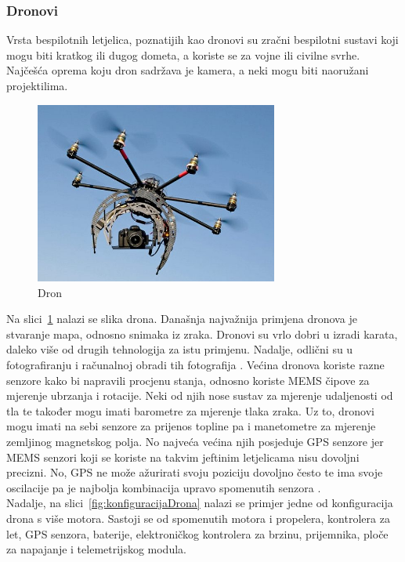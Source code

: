 \documentclass[times, utf8, diplomski]{fer}
\begin{document}
\subsubsection{Dronovi}
Vrsta bespilotnih letjelica, poznatijih kao dronovi su zračni bespilotni sustavi koji mogu biti kratkog ili dugog dometa, a koriste se za vojne ili civilne svrhe. Najčešća oprema koju dron sadržava je kamera, a neki mogu biti naoružani projektilima. 
\begin{figure}[htb]
\centering
\includegraphics[width=8cm]{img/drone.png}
\caption{Dron\protect\footnotemark}
\label{fig:dron}
\end{figure}
Na  slici~\ref{fig:dron}  nalazi  se  slika 
drona. Današnja najvažnija primjena dronova je stvaranje mapa, odnosno snimaka iz zraka. Dronovi su  vrlo dobri u izradi karata, daleko više od drugih tehnologija za istu primjenu. Nadalje, odlični su u fotografiranju i računalnoj  obradi  tih  fotografija \citep[str.~10]{Drones}. Većina dronova koriste razne senzore kako  bi  napravili  procjenu  stanja,  odnosno  koriste  MEMS  čipove  za  mjerenje  ubrzanja  i rotacije. Neki od njih nose sustav za mjerenje udaljenosti od tla te također mogu imati barometre za  mjerenje  tlaka  zraka.  Uz  to,  dronovi  mogu  imati  na  sebi senzore  za  prijenos  topline  pa  i manetometre za mjerenje zemljinog magnetskog polja. No najveća većina njih posjeduje GPS  senzore jer MEMS senzori koji se koriste na takvim jeftinim letjelicama nisu dovoljni precizni. No, GPS ne može ažurirati svoju poziciju dovoljno često te ima svoje oscilacije pa je najbolja kombinacija  upravo  spomenutih  senzora \citep[str.~13]{Drones}.\\
Nadalje, na slici~\ref{fig:konfiguracijaDrona} nalazi se primjer jedne od konfiguracija drona s više motora. Sastoji  se  od  spomenutih  motora  i  propelera,  kontrolera  za  let,  GPS  senzora,  baterije, elektroničkog kontrolera za brzinu, prijemnika, ploče za napajanje i telemetrijskog modula. 
\end{document}
